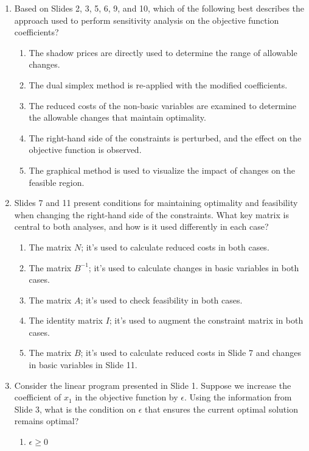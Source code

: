 \documentclass{article}%
\begin{document}
\begin{enumerate}
\vspace{1em}%
\item Based on Slides 2, 3, 5, 6, 9, and 10, which of the following best describes the approach used to perform sensitivity analysis on the objective function coefficients?%
\begin{enumerate}%
\item The shadow prices are directly used to determine the range of allowable changes.%
\item The dual simplex method is re-applied with the modified coefficients.%
\item The reduced costs of the non-basic variables are examined to determine the allowable changes that maintain optimality.%
\item The right-hand side of the constraints is perturbed, and the effect on the objective function is observed.%
\item The graphical method is used to visualize the impact of changes on the feasible region.%
\end{enumerate}%
\vspace{1em}%
\item Slides 7 and 11 present conditions for maintaining optimality and feasibility when changing the right-hand side of the constraints.  What key matrix is central to both analyses, and how is it used differently in each case?%
\begin{enumerate}%
\item The matrix $N$; it's used to calculate reduced costs in both cases.%
\item The matrix $B^{-1}$; it's used to calculate changes in basic variables in both cases.%
\item The matrix $A$; it's used to check feasibility in both cases.%
\item The identity matrix $I$; it's used to augment the constraint matrix in both cases.%
\item The matrix $B$; it's used to calculate reduced costs in Slide 7 and changes in basic variables in Slide 11.%
\end{enumerate}%
\vspace{1em}%
\item Consider the linear program presented in Slide 1. Suppose we increase the coefficient of $x_1$ in the objective function by $\epsilon$.  Using the information from Slide 3, what is the condition on $\epsilon$ that ensures the current optimal solution remains optimal?%
\begin{enumerate}%
\item $\epsilon \ge 0$%

\end{enumerate}
\end{enumerate}
\end{document}
